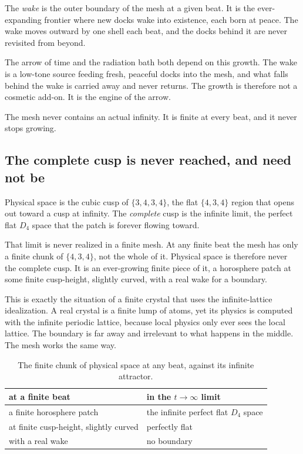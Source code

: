 \begin{definition}
The \emph{wake} is the outer boundary of the mesh at a given beat. It is the ever-expanding frontier where new docks wake into existence, each born at peace. The wake moves outward by one shell each beat, and the docks behind it are never revisited from beyond.
\end{definition}

The arrow of time and the radiation bath both depend on this growth. The wake is a low-tone source feeding fresh, peaceful docks into the mesh, and what falls behind the wake is carried away and never returns. The growth is therefore not a cosmetic add-on. It is the engine of the arrow.

\begin{principle}
The mesh never contains an actual infinity. It is finite at every beat, and it never stops growing.
\end{principle}

\subsection{The complete cusp is never reached, and need not be}

Physical space is the cubic cusp of $\{3,4,3,4\}$, the flat $\{4,3,4\}$ region that opens out toward a cusp at infinity. The \emph{complete} cusp is the infinite limit, the perfect flat $D_4$ space that the patch is forever flowing toward.

That limit is never realized in a finite mesh. At any finite beat the mesh has only a finite chunk of $\{4,3,4\}$, not the whole of it. Physical space is therefore never the complete cusp. It is an ever-growing finite piece of it, a horosphere patch at some finite cusp-height, slightly curved, with a real wake for a boundary.

This is exactly the situation of a finite crystal that uses the infinite-lattice idealization. A real crystal is a finite lump of atoms, yet its physics is computed with the infinite periodic lattice, because local physics only ever sees the local lattice. The boundary is far away and irrelevant to what happens in the middle. The mesh works the same way.

\begin{table}[ht]
\centering
\begin{tabular}{@{}ll@{}}
\toprule
at a finite beat & in the $t \to \infty$ limit \\
\midrule
a finite horosphere patch & the infinite perfect flat $D_4$ space \\
at finite cusp-height, slightly curved & perfectly flat \\
with a real wake & no boundary \\
\bottomrule
\end{tabular}
\caption{The finite chunk of physical space at any beat, against its infinite attractor.}
\label{tab:patch-vs-limit}
\end{table}

